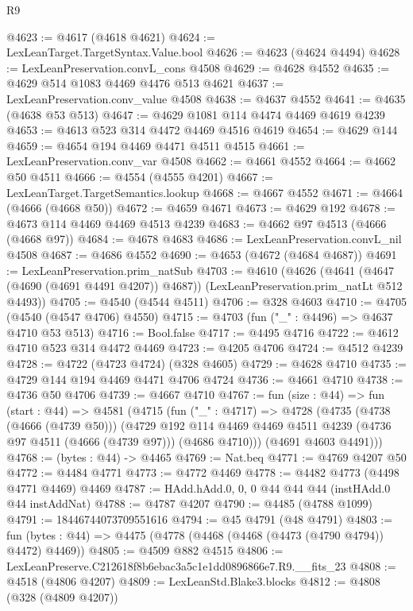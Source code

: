 \begin{lexlean}{R9}
\begin{coremodule}
@4623 := @4617 (@4618 @4621)
@4624 := LexLeanTarget.TargetSyntax.Value.bool
@4626 := @4623 (@4624 @4494)
@4628 := LexLeanPreservation.convL_cons @4508
@4629 := @4628 @4552
@4635 := @4629 @514 @1083 @4469 @4476 @513 @4621
@4637 := LexLeanPreservation.conv_value @4508
@4638 := @4637 @4552
@4641 := @4635 (@4638 @53 @513)
@4647 := @4629 @1081 @114 @4474 @4469 @4619 @4239
@4653 := @4613 @523 @314 @4472 @4469 @4516 @4619
@4654 := @4629 @144
@4659 := @4654 @194 @4469 @4471 @4511 @4515
@4661 := LexLeanPreservation.conv_var @4508
@4662 := @4661 @4552
@4664 := @4662 @50 @4511
@4666 := @4554 (@4555 @4201)
@4667 := LexLeanTarget.TargetSemantics.lookup
@4668 := @4667 @4552
@4671 := @4664 (@4666 (@4668 @50))
@4672 := @4659 @4671
@4673 := @4629 @192
@4678 := @4673 @114 @4469 @4469 @4513 @4239
@4683 := @4662 @97 @4513 (@4666 (@4668 @97))
@4684 := @4678 @4683
@4686 := LexLeanPreservation.convL_nil @4508
@4687 := @4686 @4552
@4690 := @4653 (@4672 (@4684 @4687))
@4691 := LexLeanPreservation.prim_natSub
@4703 := @4610
    (@4626
      (@4641 (@4647 (@4690 (@4691 @4491 @4207)) @4687))
      (LexLeanPreservation.prim_natLt @512 @4493))
@4705 := @4540 (@4544 @4511)
@4706 := @328 @4603
@4710 := @4705 (@4540 (@4547 @4706) @4550)
@4715 := @4703 (fun ("_" : @4496) => @4637 @4710 @53 @513)
@4716 := Bool.false
@4717 := @4495 @4716
@4722 := @4612 @4710 @523 @314 @4472 @4469
@4723 := @4205 @4706
@4724 := @4512 @4239
@4728 := @4722 (@4723 @4724) (@328 @4605)
@4729 := @4628 @4710
@4735 := @4729 @144 @194 @4469 @4471 @4706 @4724
@4736 := @4661 @4710
@4738 := @4736 @50 @4706
@4739 := @4667 @4710
@4767 := fun (size : @44) =>
  fun (start : @44) =>
  @4581
    (@4715
      (fun ("_" : @4717) =>
      @4728
        (@4735
          (@4738 (@4666 (@4739 @50)))
          (@4729
            @192
            @114
            @4469
            @4469
            @4511
            @4239
            (@4736 @97 @4511 (@4666 (@4739 @97)))
            (@4686 @4710)))
        (@4691 @4603 @4491)))
@4768 := (bytes : @44) -> @4465
@4769 := Nat.beq
@4771 := @4769 @4207 @50
@4772 := @4484 @4771
@4773 := @4772 @4469
@4778 := @4482 @4773 (@4498 @4771 @4469) @4469
@4787 := HAdd.hAdd.{0, 0, 0} @44 @44 @44 (instHAdd.{0} @44 instAddNat)
@4788 := @4787 @4207
@4790 := @4485 (@4788 @1099)
@4791 := 18446744073709551616
@4794 := @45 @4791 (@48 @4791)
@4803 := fun (bytes : @44) => @4475 (@4778 (@4468 (@4468 (@4473 (@4790 @4794)) @4472) @4469))
@4805 := @4509 @882 @4515
@4806 := LexLeanPreserve.C212618f8b6ebac3a5c1e1dd0896866e7.R9.__fits_23
@4808 := @4518 (@4806 @4207)
@4809 := LexLeanStd.Blake3.blocks
@4812 := @4808 (@328 (@4809 @4207))

\end{coremodule}
\end{lexlean}

